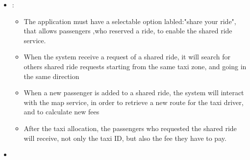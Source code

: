 \begin {itemize}
\begin{itemize}
	\end{itemize}
\item [G4]:%
	\begin{itemize}
	\item The application must have a selectable option labled:"share your ride", that allows passengers ,who reserved a ride, to enable the shared ride service.
	\item When the system receive a request of a shared ride, it will search for others shared ride requests starting from the same taxi zone, and going in the same direction %
	\item When a new passenger is added to a shared ride, the system will interact with the map service, in order to retrieve a new route for the taxi driver, and to calculate new fees
	\item After the taxi allocation, the passengers who requested the shared ride will receive, not only the taxi ID, but also the fee they have to pay.
	\end{itemize}
\item [G5] %


\end{itemize}
